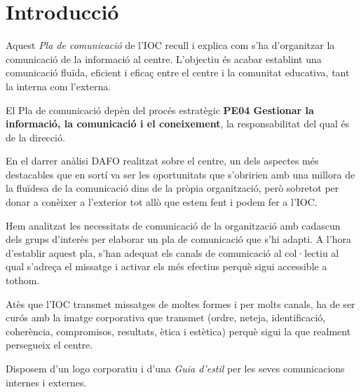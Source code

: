 \documentclass[fontsize=10pt,%
paper=a4,%
DIV=14,%
twoside=semi,%
pagesize=auto,%
parskip=half,
captions=tableheading,%
numbers=noenddot,%
toc=graduated%
]{scrartcl}
\begin{document}



\thispagestyle{empty}
\setcounter{tocdepth}{4}
\tableofcontents

\clearpage

\pagestyle{scrheadings}


\section{Introducció}\label{sec:intro}

Aquest \textit{Pla de comunicació} de l'IOC recull i explica com s'ha d'organitzar la comunicació de la informació al centre. L'objectiu és acabar establint una comunicació fluïda, eficient i eficaç entre el centre i la comunitat educativa, tant la interna com l'externa.

El Pla de comunicació depèn del procés estratègic \textbf{PE04 Gestionar la informació, la comunicació i el coneixement}, la responsabilitat del qual és de la direcció.

En el darrer anàlisi DAFO realitzat sobre el centre, un dels aspectes més destacables que en sortí va ser les oportunitats que s'obririen amb una millora de la fluïdesa de la comunicació dins de la pròpia organització, però sobretot per donar a conèixer a l'exterior tot allò que estem fent i podem fer a l'IOC.

Hem analitzat les necessitats de comunicació de la organització amb cadascun dels grups d'interès per elaborar un pla de comunicació que s'hi adapti. A l'hora d'establir aquest pla, s'han adequat els canals de comunicació al col·lectiu al qual s'adreça el missatge i activar els més efectius perquè sigui accessible a tothom.

Atès que l'IOC transmet missatges de moltes formes i per molts canals, ha de ser curós amb la imatge corporativa que transmet (ordre, neteja, identificació, coherència, compromisos, resultats, ètica i estètica) perquè sigui la que realment persegueix el centre.

Disposem d'un logo corporatiu i d'una \textit{Guia d'estil} per les seves comunicacions internes i externes.
\end{document}
